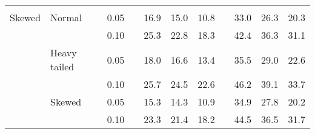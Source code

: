\begin{table}[ht]
\begin{scriptsize}
\begin{center}
\begin{tabular}{ll p{.1cm} c p{.1cm} rrr p{.1cm} rrr}
&&&&&&&&&&&\\
Skewed       & Normal       && 0.05 &&   16.9 & 15.0 & 10.8 &   & 33.0 & 26.3 & 20.3 \\ 
             &              && 0.10 &&   25.3 & 22.8 & 18.3 &   & 42.4 & 36.3 & 31.1 \\ 
             & Heavy tailed && 0.05 &&   18.0 & 16.6 & 13.4 &   & 35.5 & 29.0 & 22.6 \\ 
             &              && 0.10 &&   25.7 & 24.5 & 22.6 &   & 46.2 & 39.1 & 33.7 \\ 
             & Skewed       && 0.05 &&   15.3 & 14.3 & 10.9 &   & 34.9 & 27.8 & 20.2 \\ 
             &              && 0.10 &&   23.3 & 21.4 & 18.2 &   & 44.5 & 36.5 & 31.7 \\ 


\end{tabular}
\end{center}
\end{scriptsize}
\end{table}
